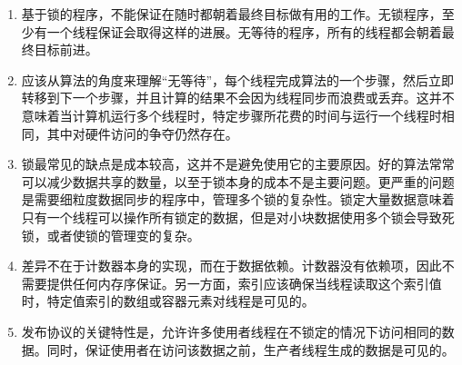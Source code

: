\begin{enumerate}
\item 
基于锁的程序，不能保证在随时都朝着最终目标做有用的工作。无锁程序，至少有一个线程保证会取得这样的进展。无等待的程序，所有的线程都会朝着最终目标前进。

\item 
应该从算法的角度来理解“无等待”，每个线程完成算法的一个步骤，然后立即转移到下一个步骤，并且计算的结果不会因为线程同步而浪费或丢弃。这并不意味着当计算机运行多个线程时，特定步骤所花费的时间与运行一个线程时相同，其中对硬件访问的争夺仍然存在。

\item 
锁最常见的缺点是成本较高，这并不是避免使用它的主要原因。好的算法常常可以减少数据共享的数量，以至于锁本身的成本不是主要问题。更严重的问题是需要细粒度数据同步的程序中，管理多个锁的复杂性。锁定大量数据意味着只有一个线程可以操作所有锁定的数据，但是对小块数据使用多个锁会导致死锁，或者使锁的管理变的复杂。

\item
差异不在于计数器本身的实现，而在于数据依赖。计数器没有依赖项，因此不需要提供任何内存序保证。另一方面，索引应该确保当线程读取这个索引值时，特定值索引的数组或容器元素对线程是可见的。

\item
发布协议的关键特性是，允许许多使用者线程在不锁定的情况下访问相同的数据。同时，保证使用者在访问该数据之前，生产者线程生成的数据是可见的。

\end{enumerate}